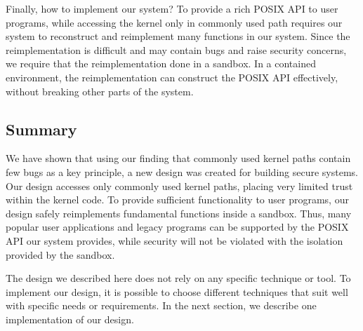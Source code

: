 Finally, how to implement our system? 
To provide a rich POSIX API to user programs, while accessing the kernel only in commonly used path requires our system to 
reconstruct and reimplement many functions in our system. Since the reimplementation is difficult and may contain bugs 
and raise security concerns, we require that the reimplementation done in a sandbox. In a contained 
environment, the reimplementation can construct the POSIX API effectively, without breaking other parts of the system.  

\subsection{Summary}
We have shown that using our finding that commonly used kernel paths contain few bugs as a key principle, a new design was created 
for building secure systems. Our design accesses only commonly used kernel paths, placing very limited trust within the kernel code. 
To provide sufficient functionality to user programs, our design safely reimplements fundamental functions inside a sandbox. Thus, many 
popular user applications and legacy programs can be supported by the POSIX API our system provides, while security will not be violated 
with the isolation provided by the sandbox. 

The design we described here does not rely on any specific technique or tool. To implement our design, it is possible to choose different techniques 
that suit well with specific needs or requirements. In the next section, we describe one implementation of our design. 
